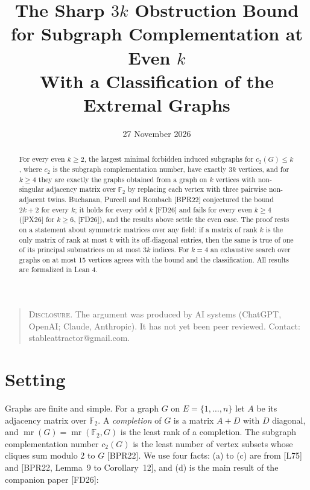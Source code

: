 \documentclass[11pt,letterpaper,reqno]{amsart}
\title[The Sharp $3k$ Obstruction Bound for Subgraph Complementation at Even $k$]{The Sharp $3k$ Obstruction Bound for Subgraph Complementation at Even $k$\\[6pt] {\mdseries\small With a Classification of the Extremal Graphs}}
\date{27 November 2026}
\theoremstyle{spaced}
\begin{document}
\begin{abstract}
For every even \(k \ge 2\), the largest minimal forbidden induced subgraphs for \(c_2(G) \le k\), where \(c_2\) is the subgraph complementation number, have exactly \(3k\) vertices, and for \(k \ge 4\) they are exactly the graphs obtained from a graph on \(k\) vertices with non-singular adjacency matrix over \(\mathbb{F}_2\) by replacing each vertex with three pairwise non-adjacent twins. Buchanan, Purcell and Rombach {[}BPR22{]} conjectured the bound \(2k+2\) for every \(k\); it holds for every odd \(k\) {[}FD26{]} and fails for every even \(k \ge 4\) ({[}PX26{]} for \(k \ge 6\), {[}FD26{]}), and the results above settle the even case. The proof rests on a statement about symmetric matrices over any field: if a matrix of rank \(k\) is the only matrix of rank at most \(k\) with its off-diagonal entries, then the same is true of one of its principal submatrices on at most \(3k\) indices. For \(k = 4\) an exhaustive search over graphs on at most 15 vertices agrees with the bound and the classification. All results are formalized in Lean 4.

\end{abstract}
\maketitle
\begin{quote}\small
\textsc{Disclosure.} The argument was produced by AI systems (ChatGPT, OpenAI; Claude, Anthropic). It has not yet been peer reviewed. Contact: stableattractor@gmail.com.

\end{quote}
\smallskip
\hypertarget{setting}{%
\section{Setting}\label{setting}}

Graphs are finite and simple. For a graph \(G\) on \(E = \{1, \dots, n\}\) let \(A\) be its adjacency matrix over \(\mathbb{F}_2\). A \emph{completion} of \(G\) is a matrix \(A + D\) with \(D\) diagonal, and \(\operatorname{mr}(G) = \operatorname{mr}(\mathbb{F}_2, G)\) is the least rank of a completion. The subgraph complementation number \(c_2(G)\) is the least number of vertex subsets whose cliques sum modulo 2 to \(G\) {[}BPR22{]}. We use four facts: (a) to (c) are from {[}L75{]} and {[}BPR22, Lemma~9 to Corollary~12{]}, and (d) is the main result of the companion paper {[}FD26{]}:
\end{document}
